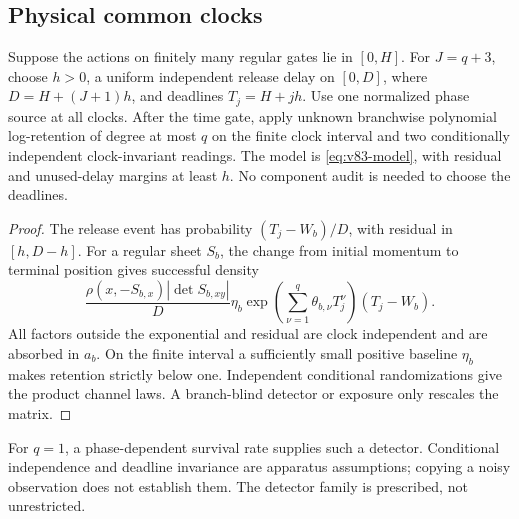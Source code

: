 \subsection{Physical common clocks}
\begin{proposition}
\label{prop:v83-physical}
Suppose the actions on finitely many regular gates lie in $[0,H]$.
For $J=q+3$, choose $h>0$, a uniform independent release delay on
$[0,D]$, where $D=H+(J+1)h$, and deadlines $T_j=H+jh$.
Use one normalized phase source at all clocks. After the time gate,
apply unknown branchwise polynomial log-retention of degree at most
$q$ on the finite clock interval and two conditionally independent
clock-invariant readings. The model is \eqref{eq:v83-model}, with
residual and unused-delay margins at least $h$. No component audit is
needed to choose the deadlines.
\end{proposition}
\begin{proof}
The release event has probability $(T_j-W_b)/D$, with residual in
$[h,D-h]$. For a regular sheet $S_b$, the change from initial momentum
to terminal position gives successful density
\[
 \frac{\rho(x,-S_{b,x})|\det S_{b,xy}|}{D}
 \eta_b\exp\left(\sum_{\nu=1}^q\theta_{b,\nu}T_j^\nu\right)
 (T_j-W_b).
\]
All factors outside the exponential and residual are clock independent
and are absorbed in $a_b$. On the finite interval a sufficiently
small positive baseline $\eta_b$ makes retention strictly below one.
Independent conditional randomizations give the product channel laws.
A branch-blind detector or exposure only rescales the matrix.
\end{proof}
For $q=1$, a phase-dependent survival rate supplies such a detector.
Conditional independence and deadline invariance are apparatus
assumptions; copying a noisy observation does not establish them.
The detector family is prescribed, not unrestricted.

